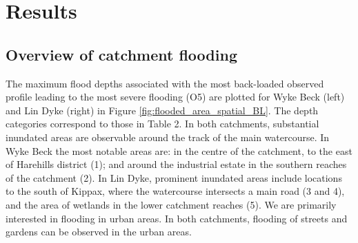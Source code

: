 \documentclass[APA,Times2COL]{WileyNJDv5}
\begin{document}
\section{Results}\label{sec:results}

\subsection{Overview of catchment flooding}\label{subsec:overview}

The maximum flood depths associated with the most back-loaded observed profile leading to the most severe flooding (O5) are plotted for Wyke Beck (left) and Lin Dyke (right) in Figure \ref{fig:flooded_area_spatial_BL}. The depth categories correspond to those in Table 2. In both catchments, substantial inundated areas are observable around the track of the main watercourse. In Wyke Beck the most notable areas are: in the centre of the catchment, to the east of Harehills district (1); and around the industrial estate in the southern reaches of the catchment (2). In Lin Dyke, prominent inundated areas include locations to the south of Kippax, where the watercourse intersects a main road (3 and 4), and the area of wetlands in the lower catchment reaches (5). We are primarily interested in flooding in urban areas. In both catchments, flooding of streets and gardens can be observed in the urban areas.
\end{document}
